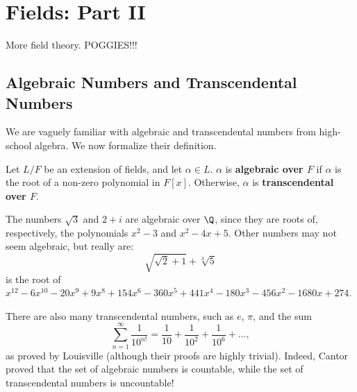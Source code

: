 \documentclass[math1530-lecture-notes]{subfiles}
\begin{document}
\chapter{Fields: Part II}

More field theory. POGGIES!!!

\section{Algebraic Numbers and Transcendental Numbers}
We are vaguely familiar with algebraic and transcendental numbers from high-school algebra. We now
formalize their definition.
\begin{definition}{}
  Let $L / F$ be an extension of fields, and let $\alpha\in L$. $\alpha$ is \textbf{algebraic over
  $F$} if $\alpha$ is the root of a non-zero polynomial in $F[x]$. Otherwise, $\alpha$ is
  \textbf{transcendental over $F$}.
\end{definition}

The numbers $\sqrt{3}$ and $2+i$ are algebraic over $\Q$, since they are roots of, respectively, the
polynomials $x^2-3$ and $x^2-4x+5$. Other numbers may not seem algebraic, but really are: \[
  \sqrt{\sqrt{2}+1}+\sqrt[3]{5}
\] is the root of $x^{12}-
6x^{10}-20x^{9}+9x^{8}+154x^{6}-360x^{5}+441x^{4}-180x^3-456x^2-1680x+274$.

There are also many transcendental numbers, such as $e$, $\pi$, and the sum \[
  \sum_{n=1}^{\infty} \frac{1}{10^{n!}}=\frac{1}{10}+\frac{1}{10^2}+\frac{1}{10^6}+\ldots
,\] as proved by Louisville (although their proofs are highly trivial). Indeed, Cantor proved that
the set of algebraic numbers is countable, while the set of transcendental numbers is uncountable!
\end{document}
